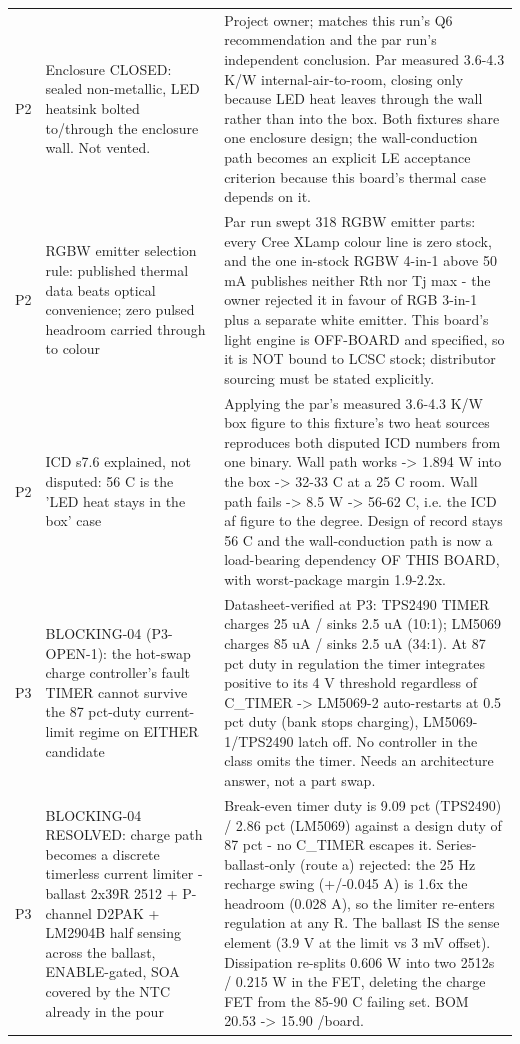 \documentclass[11pt,a4paper]{article}
\begin{document}
{\begin{longtable}{lp{5.2cm}p{7.2cm}}
P2 & Enclosure CLOSED: sealed non-metallic, LED heatsink bolted to/through the enclosure wall. Not vented. & Project owner; matches this run's Q6 recommendation and the par run's independent conclusion. Par measured 3.6-4.3 K/W internal-air-to-room, closing only because LED heat leaves through the wall rather than into the box. Both fixtures share one enclosure design; the wall-conduction path becomes an explicit LE acceptance criterion because this board's thermal case depends on it. \\
P2 & RGBW emitter selection rule: published thermal data beats optical convenience; zero pulsed headroom carried through to colour & Par run swept 318 RGBW emitter parts: every Cree XLamp colour line is zero stock, and the one in-stock RGBW 4-in-1 above 50 mA publishes neither Rth nor Tj max - the owner rejected it in favour of RGB 3-in-1 plus a separate white emitter. This board's light engine is OFF-BOARD and specified, so it is NOT bound to LCSC stock; distributor sourcing must be stated explicitly. \\
P2 & ICD s7.6 explained, not disputed: 56 C is the 'LED heat stays in the box' case & Applying the par's measured 3.6-4.3 K/W box figure to this fixture's two heat sources reproduces both disputed ICD numbers from one binary. Wall path works -\textgreater{} 1.894 W into the box -\textgreater{} 32-33 C at a 25 C room. Wall path fails -\textgreater{} 8.5 W -\textgreater{} 56-62 C, i.e. the ICD af figure to the degree. Design of record stays 56 C and the wall-conduction path is now a load-bearing dependency OF THIS BOARD, with worst-package margin 1.9-2.2x. \\
P3 & BLOCKING-04 (P3-OPEN-1): the hot-swap charge controller's fault TIMER cannot survive the 87 pct-duty current-limit regime on EITHER candidate & Datasheet-verified at P3: TPS2490 TIMER charges 25 uA / sinks 2.5 uA (10:1); LM5069 charges 85 uA / sinks 2.5 uA (34:1). At 87 pct duty in regulation the timer integrates positive to its 4 V threshold regardless of C\_TIMER -\textgreater{} LM5069-2 auto-restarts at 0.5 pct duty (bank stops charging), LM5069-1/TPS2490 latch off. No controller in the class omits the timer. Needs an architecture answer, not a part swap. \\
P3 & BLOCKING-04 RESOLVED: charge path becomes a discrete timerless current limiter - ballast 2x39R 2512 + P-channel D2PAK + LM2904B half sensing across the ballast, ENABLE-gated, SOA covered by the NTC already in the pour & Break-even timer duty is 9.09 pct (TPS2490) / 2.86 pct (LM5069) against a design duty of 87 pct - no C\_TIMER escapes it. Series-ballast-only (route a) rejected: the 25 Hz recharge swing (+/-0.045 A) is 1.6x the headroom (0.028 A), so the limiter re-enters regulation at any R. The ballast IS the sense element (3.9 V at the limit vs 3 mV offset). Dissipation re-splits 0.606 W into two 2512s / 0.215 W in the FET, deleting the charge FET from the 85-90 C failing set. BOM 20.53 -\textgreater{} 15.90 /board. \\

\end{longtable}}
\end{document}
